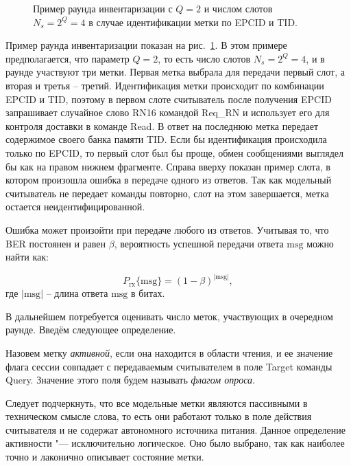 \begin{figure}[htb]
  \caption[Пример раунда опроса при идентификации по EPCID и TID.]{Пример раунда инвентаризации с $Q=2$ и числом слотов $N_s=2^Q=4$ в случае идентификации метки по EPCID и TID. }
  \label{fig:ch3_inventory_round}
\end{figure}

Пример раунда инвентаризации показан на рис.~\ref{fig:ch3_inventory_round}. В этом примере предполагается, что параметр $Q = 2$, то есть число слотов $N_s = 2^Q = 4$, и в раунде участвуют три метки. Первая метка выбрала для передачи первый слот, а вторая и третья -- третий. Идентификация метки происходит по комбинации EPCID и TID, поэтому в первом слоте считыватель после получения EPCID запрашивает случайное слово RN16 командой Req\_RN и использует его для контроля доставки в команде Read. В ответ на последнюю метка передает содержимое своего банка памяти TID. Если бы идентификация происходила только по EPCID, то первый слот был бы проще, обмен сообщениями выглядел бы как на правом нижнем фрагменте. Справа вверху показан пример слота, в котором произошла ошибка в передаче одного из ответов. Так как модельный считыватель не передает команды повторно, слот на этом завершается, метка остается неидентифицированной.

Ошибка может произойти при передаче любого из ответов. Учитывая то, что BER постоянен и равен $\beta$, вероятность успешной передачи ответа $\text{msg}$ можно найти как:

\begin{equation}\label{eq:ch3_response_err}
	P_\text{rx}\{\text{msg}\} = (1 - \beta)^{|\text{msg}|},
\end{equation}
где $|\text{msg}|$ -- длина ответа $\text{msg}$ в битах.

В дальнейшем потребуется оценивать число меток, участвующих в очередном раунде. Введём следующее определение.

\begin{defn}
	Назовем метку \textit{активной}, если она находится в области чтения, и ее значение флага сессии совпадает с передаваемым считывателем в поле Target команды Query. Значение этого поля будем называть \textit{флагом опроса}.
\end{defn}
\begin{rem}
	Следует подчеркнуть, что все модельные метки являются пассивными в техническом смысле слова, то есть они работают только в поле действия считывателя и не содержат автономного источника питания. Данное определение активности "--- исключительно логическое. Оно было выбрано, так как наиболее точно и лаконично описывает состояние метки.
\end{rem}

